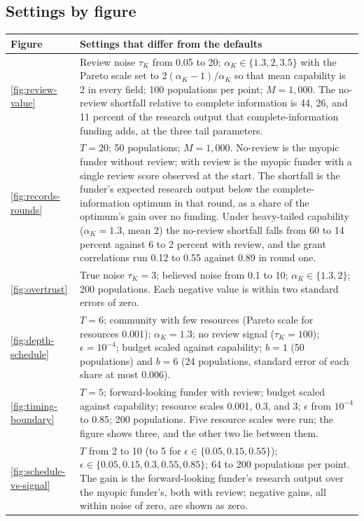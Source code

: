 \subsection*{Settings by figure}
\begin{table}[h]
\centering
\small
\begin{tabular}{@{}p{2.1cm}p{10.2cm}@{}}
\toprule
Figure & Settings that differ from the defaults \\
\midrule
\ref{fig:review-value} & Review noise $\tau_K$ from 0.05 to 20; $\alpha_K \in \{1.3, 2, 3.5\}$ with the Pareto scale set to $2(\alpha_K - 1)/\alpha_K$ so that mean capability is 2 in every field; 100 populations per point; $M = 1{,}000$. The no-review shortfall relative to complete information is 44, 26, and 11 percent of the research output that complete-information funding adds, at the three tail parameters. \\
\ref{fig:records-rounds} & $T = 20$; 50 populations; $M = 1{,}000$. No-review is the myopic funder without review; with review is the myopic funder with a single review score observed at the start. The shortfall is the funder's expected research output below the complete-information optimum in that round, as a share of the optimum's gain over no funding. Under heavy-tailed capability ($\alpha_K = 1.3$, mean 2) the no-review shortfall falls from 60 to 14 percent against 6 to 2 percent with review, and the grant correlations run 0.12 to 0.55 against 0.89 in round one. \\
\ref{fig:overtrust} & True noise $\tau_K = 3$; believed noise from 0.1 to 10; $\alpha_K \in \{1.3, 2\}$; 200 populations. Each negative value is within two standard errors of zero. \\
\ref{fig:depth-schedule} & $T = 6$; community with few resources (Pareto scale for resources 0.001); $\alpha_K = 1.3$; no review signal ($\tau_K = 100$); $\epsilon = 10^{-4}$; budget scaled against capability; $b = 1$ (50 populations) and $b = 6$ (24 populations, standard error of each share at most 0.006). \\
\ref{fig:timing-boundary} & $T = 5$; forward-looking funder with review; budget scaled against capability; resource scales 0.001, 0.3, and 3; $\epsilon$ from $10^{-4}$ to 0.85; 200 populations. Five resource scales were run; the figure shows three, and the other two lie between them. \\
\ref{fig:schedule-vs-signal} & $T$ from 2 to 10 (to 5 for $\epsilon \in \{0.05, 0.15, 0.55\}$); $\epsilon \in \{0.05, 0.15, 0.3, 0.55, 0.85\}$; 64 to 200 populations per point. The gain is the forward-looking funder's research output over the myopic funder's, both with review; negative gains, all within noise of zero, are shown as zero. \\

\end{tabular}
\end{table}
